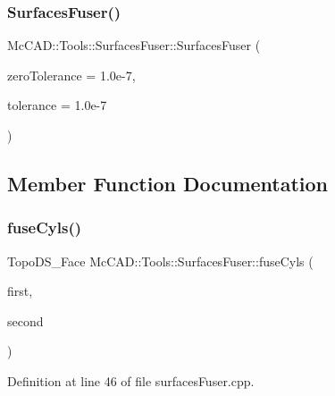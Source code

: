 \subsubsection{\texorpdfstring{Surfaces\+Fuser()}{SurfacesFuser()}\hspace{0.1cm}{\footnotesize\ttfamily [2/2]}}
{\footnotesize\ttfamily Mc\+C\+A\+D\+::\+Tools\+::\+Surfaces\+Fuser\+::\+Surfaces\+Fuser (\begin{DoxyParamCaption}\item[{Standard\+\_\+\+Real}]{zero\+Tolerance = {\ttfamily 1.0e-\/7},  }\item[{Standard\+\_\+\+Real}]{tolerance = {\ttfamily 1.0e-\/7} }\end{DoxyParamCaption})}



\subsection{Member Function Documentation}
\mbox{\label{classMcCAD_1_1Tools_1_1SurfacesFuser_a803a59817fecd64ef1d8bf4a41c320ed}} 
\subsubsection{\texorpdfstring{fuse\+Cyls()}{fuseCyls()}\hspace{0.1cm}{\footnotesize\ttfamily [1/2]}}
{\footnotesize\ttfamily Topo\+D\+S\+\_\+\+Face Mc\+C\+A\+D\+::\+Tools\+::\+Surfaces\+Fuser\+::fuse\+Cyls (\begin{DoxyParamCaption}\item[{const Topo\+D\+S\+\_\+\+Face \&}]{first,  }\item[{const Topo\+D\+S\+\_\+\+Face \&}]{second }\end{DoxyParamCaption})\hspace{0.3cm}{\ttfamily [private]}}



Definition at line 46 of file surfaces\+Fuser.\+cpp.


